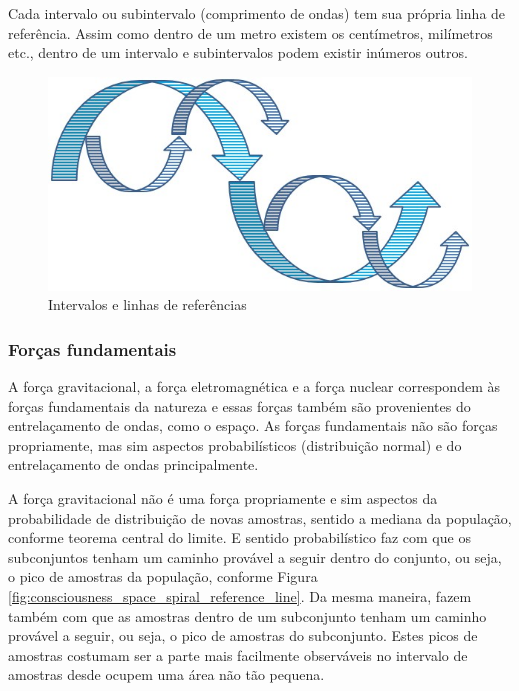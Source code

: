 Cada intervalo ou subintervalo (comprimento de ondas) tem sua própria linha de referência. Assim como dentro de um metro existem os centímetros, milímetros etc., dentro de um intervalo e subintervalos podem existir inúmeros outros.
	\begin{figure}[H]
	\caption{Intervalos e linhas de referências}
	\label{fig:consciousness_space_spiral_underlines}
	\centering
	\includegraphics[scale=.5]{sections/images/consciousness_space_spiral_underlines.jpg}
	\end{figure}

\subsubsection{Forças fundamentais}
A força gravitacional, a força eletromagnética e a força nuclear correspondem às forças fundamentais da natureza e essas forças também são provenientes do entrelaçamento de ondas, como o espaço. As forças fundamentais não são forças propriamente, mas sim aspectos probabilísticos (distribuição normal) e do entrelaçamento de ondas principalmente.

A força gravitacional não é uma força propriamente e sim aspectos da probabilidade de distribuição de novas amostras, sentido a mediana da população, conforme teorema central do limite. E sentido probabilístico faz com que os subconjuntos tenham um caminho provável a seguir dentro do conjunto, ou seja, o pico de amostras da população, conforme Figura \ref{fig:consciousness_space_spiral_reference_line}. Da mesma maneira, fazem também com que as amostras dentro de um subconjunto tenham um caminho provável a seguir, ou seja, o pico de amostras do subconjunto. Estes picos de amostras costumam ser a parte mais facilmente observáveis no intervalo de amostras desde ocupem uma área não tão pequena. 

